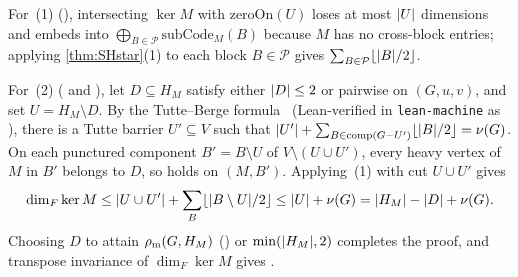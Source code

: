 \begin{outline}
For~(1) (), intersecting $\ker M$ with $\mathrm{zeroOn}(U)$ loses at most $\lvert U \rvert$
dimensions and embeds into $\bigoplus_{B \in \mathcal{P}} \mathrm{subCode}_M(B)$ because $M$ has no cross-block entries;
applying \cref{thm:SHstar}(1) to each block $B \in \mathcal{P}$ gives $\sum_{B \in \mathcal{P}} \lfloor \lvert B \rvert/2 \rfloor$.

For~(2) ( and ), let $D \subseteq H_M$
satisfy either $\lvert D \rvert \le 2$ or pairwise  on $(G, u, v)$, and set $U = H_M \setminus D$. By the
Tutte--Berge formula~\cite{Berge1958} (Lean-verified in \texttt{lean-machine} as
), there is a Tutte barrier $U' \subseteq V$ such that
$\lvert U' \rvert + \sum_{B \in \mathrm{comp}(G - U')} \lfloor \lvert B \rvert/2 \rfloor = \nu(G)$. On each punctured component $B' =
B \setminus U$ of $V \setminus (U \cup U')$, every heavy vertex of $M$ in $B'$ belongs to $D$, so  holds on
$(M, B')$. Applying~(1) with cut $U \cup U'$ gives
\[
  \dim_F \ker M \le \lvert U \cup U' \rvert + \sum_{B} \lfloor \lvert B \setminus U \rvert/2 \rfloor
  \le \lvert U \rvert + \nu(G) = \lvert H_M \rvert - \lvert D \rvert + \nu(G).
\]
Choosing $D$ to attain $\rho_{\mathrm{m}}(G, H_M)$ () or $\min(\lvert H_M \rvert, 2)$ completes the proof, and
transpose invariance of $\dim_F \ker M$ gives .
\end{outline}

